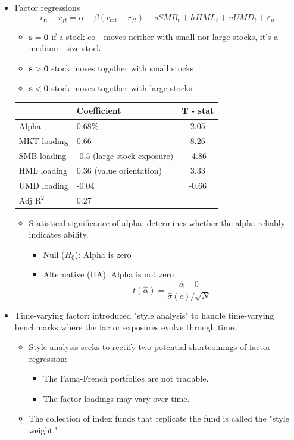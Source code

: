 \begin{itemize}
\item Factor regressions
\[
r_{\mathrm{it}} - r_{ft} = \alpha + \beta (r_{\mathrm{mt}} - r_{ft}) + s SMB_t + h HML_t + u UMD_t + \varepsilon_{it}
\]
\begin{itemize}
    \item \(\mathbf{s = 0}\) if a stock co - moves neither with small nor large stocks, it's a medium - size stock
    \item \(\mathbf{s > 0}\) stock moves together with small stocks
    \item \(\mathbf{s < 0}\) stock moves together with large stocks
\end{itemize}


\begin{table}[htbp]
    \centering
    \begin{tabular}{l l c}
        \toprule
         & Coefficient & T - stat \\
        \midrule
        Alpha & 0.68\% & 2.05 \\
        MKT loading & 0.66 & 8.26 \\
        SMB loading & -0.5 (large stock exposure) & -4.86 \\
        HML loading & 0.36 (value orientation) & 3.33 \\
        UMD loading & -0.04 & -0.66 \\
        Adj R$^2$ & 0.27 &  \\
        \bottomrule
    \end{tabular}
\end{table}

    \begin{itemize}
    \item Statistical significance of alpha: determines whether the alpha reliably indicates ability.
        \begin{itemize}
        \item Null ($H_0$): Alpha is zero
        \item Alternative (HA): Alpha is not zero
        \[
t(\hat{\alpha}) = \frac{\hat{\alpha} - 0}{\hat{\sigma}(e)/\sqrt{N}}
\]

        \end{itemize}
        
    \end{itemize}
    

\item Time-varying factor: introduced "style analysis" to handle time-varying benchmarks where the factor exposures evolve through time.
    \begin{itemize}
    \item Style analysis seeks to rectify two potential shortcomings of factor regression:
        \begin{itemize}
        \item The Fama-French portfolios are not tradable.
        \item The factor loadings may vary over time.
        \end{itemize}
    \item The collection of index funds that replicate the fund is called the "style weight."
    \end{itemize}
    

\end{itemize}

